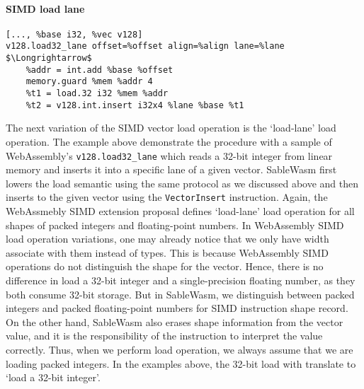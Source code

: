 \paragraph{SIMD load lane} \quad
\begin{lstlisting}[basicstyle=\linespread{1}\small\ttfamily, language=SableWasmMIR, mathescape=true]
[..., %base i32, %vec v128]
v128.load32_lane offset=%offset align=%align lane=%lane $\Longrightarrow$
    %addr = int.add %base %offset
    memory.guard %mem %addr 4
    %t1 = load.32 i32 %mem %addr
    %t2 = v128.int.insert i32x4 %lane %base %t1
\end{lstlisting}
The next variation of the SIMD vector load operation is the `load-lane' load operation. The example above demonstrate the procedure with a sample of WebAssembly's \texttt{v128.load32\_lane}  which reads a 32-bit integer from linear memory and inserts it into a specific lane of a given vector. SableWasm first lowers the load semantic using the same protocol as we discussed above and then inserts to the given vector using the \texttt{VectorInsert} instruction. Again, the WebAssmebly SIMD extension proposal defines `load-lane' load operation for all shapes of packed integers and floating-point numbers. In WebAssembly SIMD load operation variations, one may already notice that we only have width associate with them instead of types. This is because WebAssembly SIMD operations do not distinguish the shape for the vector. Hence, there is no difference in load a 32-bit integer and a single-precision floating number, as they both consume 32-bit storage. But in SableWasm, we distinguish between packed integers and packed floating-point numbers for SIMD instruction shape record.  On the other hand, SableWasm also erases shape information from the vector value, and it is the responsibility of the instruction to interpret the value correctly. Thus, when we perform load operation, we always assume that we are loading packed integers. In the examples above, the 32-bit load with translate to `load a 32-bit integer'.

